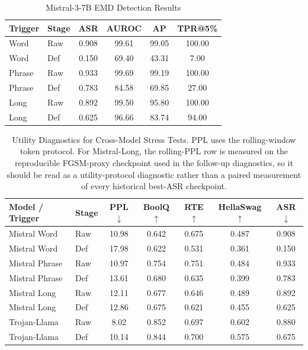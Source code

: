 \documentclass[lettersize,journal]{IEEEtran}
\begin{document}
\begin{table}[!t]
\caption{Mistral-3-7B EMD Detection Results}
\label{tab:mistral_emd}
\centering
\begin{tabular}{llcccc}
\toprule
Trigger & Stage & ASR & AUROC & AP & TPR@5\% \\
\midrule
Word & Raw & 0.908 & 99.61 & 99.05 & 100.00 \\
Word & Def & 0.150 & 69.40 & 43.31 & 7.00 \\
Phrase & Raw & 0.933 & 99.69 & 99.19 & 100.00 \\
Phrase & Def & 0.783 & 84.58 & 69.85 & 27.00 \\
Long & Raw & 0.892 & 99.50 & 95.80 & 100.00 \\
Long & Def & 0.625 & 96.66 & 83.74 & 94.00 \\
\bottomrule
\end{tabular}
\end{table}

\begin{table}[!t]
\caption{Utility Diagnostics for Cross-Model Stress Tests. PPL uses the rolling-window token protocol. For Mistral-Long, the rolling-PPL row is measured on the reproducible FGSM-proxy checkpoint used in the follow-up diagnostics, so it should be read as a utility-protocol diagnostic rather than a paired measurement of every historical best-ASR checkpoint.}
\label{tab:stress_utility}
\centering
\begin{tabular}{llccccc}
\toprule
Model / Trigger & Stage & PPL$\downarrow$ & BoolQ$\uparrow$ & RTE$\uparrow$ & HellaSwag$\uparrow$ & ASR$\downarrow$ \\
\midrule
Mistral Word & Raw & 10.98 & 0.642 & 0.675 & 0.487 & 0.908 \\
Mistral Word & Def & 17.98 & 0.622 & 0.531 & 0.361 & 0.150 \\
Mistral Phrase & Raw & 10.97 & 0.754 & 0.751 & 0.484 & 0.933 \\
Mistral Phrase & Def & 13.61 & 0.680 & 0.635 & 0.399 & 0.783 \\
Mistral Long & Raw & 12.11 & 0.677 & 0.646 & 0.489 & 0.892 \\
Mistral Long & Def & 12.86 & 0.675 & 0.621 & 0.455 & 0.625 \\
Trojan-Llama & Raw & 8.02 & 0.852 & 0.697 & 0.602 & 0.880 \\
Trojan-Llama & Def & 10.14 & 0.844 & 0.700 & 0.575 & 0.675 \\
\bottomrule
\end{tabular}
\end{table}
\end{document}
